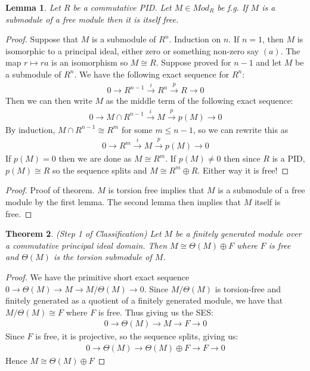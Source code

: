\documentclass[12pt]{book}
\newtheorem{theorem}{Theorem}[chapter]
\newtheorem{lemma}[theorem]{Lemma}
\theoremstyle{definition}
\begin{document}
\begin{lemma}
    Let $R$ be a commutative PID. Let $M \in Mod_R$ be f.g. If $M$ is a submodule of a free module then it is itself free. 
\end{lemma}
\begin{proof}
    Suppose that $M$ is a submodule of $R^n$. Induction on $n$. If $n=1$, then $M$ is isomorphic to a principal ideal, either zero or something non-zero say $(a)$. The map $r \mapsto ra$ is an isomorphism so $M \cong R$. Suppose proved for $n-1$ and let $M$ be a submodule of $R^n$. We have the following exact sequence for $R^n$: 
    \begin{align*}
        0 \rightarrow R^{n-1} \xrightarrow{i} R^n \xrightarrow{p} R \rightarrow 0
    \end{align*}
    Then we can then write $M$ as the middle term of the following exact sequence: 
    \begin{align*}
        0 \rightarrow M \cap R^{n-1} \xrightarrow{i} M \xrightarrow{p} p(M) \rightarrow 0
    \end{align*}
    By induction, $M \cap R^{n-1} \cong R^m$ for some $m \leq n-1$, so we can rewrite this as
    \begin{align*}
        0 \rightarrow R^m \xrightarrow{i} M \xrightarrow{p} p(M) \rightarrow 0 
    \end{align*}
    If $p(M) = 0$ then we are done as $M \cong R^m$. If $p(M) \neq 0$ then since $R$ is a PID, $p(M) \cong R$ so the sequence splits and $M \cong R^m \oplus R$. Either way it is free!
\end{proof}

\begin{proof}
    Proof of theorem. $M$ is torsion free implies that $M$ is a submodule of a free module by the first lemma. The second lemma then implies that $M$ itself is free. 
\end{proof}

\begin{theorem}
    (Step 1 of Classification) Let $M$ be a finitely generated module over a commutative principal ideal domain. Then $M \cong \Theta(M) \oplus F$ where $F$ is free and $\Theta(M)$ is the torsion submodule of $M$. 
\end{theorem}
\begin{proof}
    We have the primitive short exact sequence $ 0 \rightarrow \Theta(M) \rightarrow M \rightarrow M/\Theta(M) \rightarrow 0$. Since $M/\Theta(M)$ is torsion-free and finitely generated as a quotient of a finitely generated module, we have that $M/\Theta(M) \cong F$ where $F$ is free. Thus giving us the SES: 
    \begin{align*}
        0 \rightarrow \Theta(M) \rightarrow M \rightarrow F \rightarrow 0
    \end{align*}
    Since $F$ is free, it is projective, so the sequence splits, giving us: 
    \begin{align*}
        0 \rightarrow \Theta(M) \rightarrow \Theta(M) \oplus F \rightarrow F \rightarrow 0 
    \end{align*}
    Hence $M \cong  \Theta(M) \oplus  F$
\end{proof}
\end{document}
